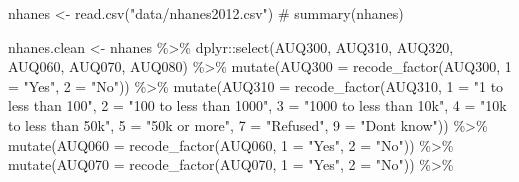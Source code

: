 \documentclass[
  letterpaper,
  DIV=11,
  numbers=noendperiod]{scrreprt}
\newenvironment{Shaded}{\begin{snugshade}}{\end{snugshade}}
\newcommand{\AttributeTok}[1]{\textcolor[rgb]{0.40,0.45,0.13}{#1}}
\newcommand{\CommentTok}[1]{\textcolor[rgb]{0.37,0.37,0.37}{#1}}
\newcommand{\FunctionTok}[1]{\textcolor[rgb]{0.28,0.35,0.67}{#1}}
\newcommand{\NormalTok}[1]{\textcolor[rgb]{0.00,0.23,0.31}{#1}}
\newcommand{\OtherTok}[1]{\textcolor[rgb]{0.00,0.23,0.31}{#1}}
\newcommand{\SpecialCharTok}[1]{\textcolor[rgb]{0.37,0.37,0.37}{#1}}
\newcommand{\StringTok}[1]{\textcolor[rgb]{0.13,0.47,0.30}{#1}}
\begin{document}
\begin{Shaded}
\begin{Highlighting}[]
\NormalTok{nhanes }\OtherTok{\textless{}{-}} \FunctionTok{read.csv}\NormalTok{(}\StringTok{"data/nhanes2012.csv"}\NormalTok{)}
\CommentTok{\# summary(nhanes)}

\NormalTok{nhanes.clean }\OtherTok{\textless{}{-}}\NormalTok{ nhanes }\SpecialCharTok{\%\textgreater{}\%}
\NormalTok{    dplyr}\SpecialCharTok{::}\FunctionTok{select}\NormalTok{(AUQ300, AUQ310, AUQ320, AUQ060, AUQ070, AUQ080) }\SpecialCharTok{\%\textgreater{}\%}
    \FunctionTok{mutate}\NormalTok{(}\AttributeTok{AUQ300 =} \FunctionTok{recode\_factor}\NormalTok{(AUQ300, }\StringTok{\textasciigrave{}}\AttributeTok{1}\StringTok{\textasciigrave{}} \OtherTok{=} \StringTok{"Yes"}\NormalTok{, }\StringTok{\textasciigrave{}}\AttributeTok{2}\StringTok{\textasciigrave{}} \OtherTok{=} \StringTok{"No"}\NormalTok{)) }\SpecialCharTok{\%\textgreater{}\%}
    \FunctionTok{mutate}\NormalTok{(}\AttributeTok{AUQ310 =} \FunctionTok{recode\_factor}\NormalTok{(AUQ310, }\StringTok{\textasciigrave{}}\AttributeTok{1}\StringTok{\textasciigrave{}} \OtherTok{=} \StringTok{"1 to less than 100"}\NormalTok{, }\StringTok{\textasciigrave{}}\AttributeTok{2}\StringTok{\textasciigrave{}} \OtherTok{=} \StringTok{"100 to less than 1000"}\NormalTok{,}
        \StringTok{\textasciigrave{}}\AttributeTok{3}\StringTok{\textasciigrave{}} \OtherTok{=} \StringTok{"1000 to less than 10k"}\NormalTok{, }\StringTok{\textasciigrave{}}\AttributeTok{4}\StringTok{\textasciigrave{}} \OtherTok{=} \StringTok{"10k to less than 50k"}\NormalTok{, }\StringTok{\textasciigrave{}}\AttributeTok{5}\StringTok{\textasciigrave{}} \OtherTok{=} \StringTok{"50k or more"}\NormalTok{,}
        \StringTok{\textasciigrave{}}\AttributeTok{7}\StringTok{\textasciigrave{}} \OtherTok{=} \StringTok{"Refused"}\NormalTok{, }\StringTok{\textasciigrave{}}\AttributeTok{9}\StringTok{\textasciigrave{}} \OtherTok{=} \StringTok{"Don\textquotesingle{}t know"}\NormalTok{)) }\SpecialCharTok{\%\textgreater{}\%}
    \FunctionTok{mutate}\NormalTok{(}\AttributeTok{AUQ060 =} \FunctionTok{recode\_factor}\NormalTok{(AUQ060, }\StringTok{\textasciigrave{}}\AttributeTok{1}\StringTok{\textasciigrave{}} \OtherTok{=} \StringTok{"Yes"}\NormalTok{, }\StringTok{\textasciigrave{}}\AttributeTok{2}\StringTok{\textasciigrave{}} \OtherTok{=} \StringTok{"No"}\NormalTok{)) }\SpecialCharTok{\%\textgreater{}\%}
    \FunctionTok{mutate}\NormalTok{(}\AttributeTok{AUQ070 =} \FunctionTok{recode\_factor}\NormalTok{(AUQ070, }\StringTok{\textasciigrave{}}\AttributeTok{1}\StringTok{\textasciigrave{}} \OtherTok{=} \StringTok{"Yes"}\NormalTok{, }\StringTok{\textasciigrave{}}\AttributeTok{2}\StringTok{\textasciigrave{}} \OtherTok{=} \StringTok{"No"}\NormalTok{)) }\SpecialCharTok{\%\textgreater{}\%}

\end{Highlighting}
\end{Shaded}
\end{document}
